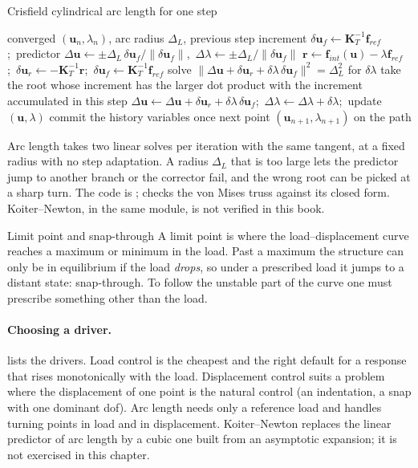 \begin{algbox}{Crisfield cylindrical arc length for one step}
\begin{pseudo}
\Require converged $(\bm u_n,\lambda_n)$, arc radius $\Delta_L$, previous step increment
\State $\delta\bm u_f\gets\bm K_T^{-1}\bm f_{ref}$;\ predictor $\Delta\bm u\gets\pm\Delta_L\,\delta\bm u_f/\|\delta\bm u_f\|$,\ $\Delta\lambda\gets\pm\Delta_L/\|\delta\bm u_f\|$ 
\Repeat
  \State $\bm r\gets\bm f_{int}(\bm u)-\lambda\bm f_{ref}$;\ $\delta\bm u_r\gets-\bm K_T^{-1}\bm r$;\ $\delta\bm u_f\gets\bm K_T^{-1}\bm f_{ref}$
  \State solve $\|\Delta\bm u+\delta\bm u_r+\delta\lambda\,\delta\bm u_f\|^2=\Delta_L^2$ for $\delta\lambda$ 
  \State take the root whose increment has the larger dot product with the increment accumulated in this step
  \State $\Delta\bm u\gets\Delta\bm u+\delta\bm u_r+\delta\lambda\,\delta\bm u_f$;\ $\Delta\lambda\gets\Delta\lambda+\delta\lambda$;\ update $(\bm u,\lambda)$
\State commit the history variables once
\Ensure next point $(\bm u_{n+1},\lambda_{n+1})$ on the path
\end{pseudo}
\end{algbox}

Arc length takes two linear solves per iteration with the same tangent, at a fixed radius with no step adaptation. A radius $\Delta_L$ that is too large lets the predictor jump to another branch or the corrector fail, and the wrong root can be picked at a sharp turn. The code is ;  checks the von Mises truss against its closed form. Koiter--Newton, in the same module, is not verified in this book.

\begin{sidenote}{Limit point and snap-through}
A limit point is where the load--displacement curve reaches a maximum or minimum in the load. Past a maximum the structure can only be in equilibrium if the load \emph{drops}, so under a prescribed load it jumps to a distant state: snap-through. To follow the unstable part of the curve one must prescribe something other than the load.
\end{sidenote}

\paragraph{Choosing a driver.}
 lists the drivers. Load control is the cheapest and the right default for a response that rises monotonically with the load. Displacement control suits a problem where the displacement of one point is the natural control (an indentation, a snap with one dominant dof). Arc length \citep{riks1979,crisfield1981} needs only a reference load and handles turning points in load and in displacement. Koiter--Newton \citep{liang2014koiternewton} replaces the linear predictor of arc length by a cubic one built from an asymptotic expansion; it is not exercised in this chapter.

